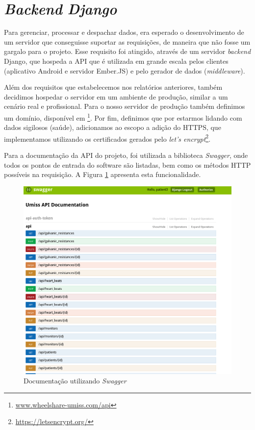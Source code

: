 \section{\textit{Backend} \textit{Django}}

Para gerenciar, processar e despachar dados, era esperado o desenvolvimento de
um servidor que conseguisse suportar as requisições,
de maneira que não fosse um gargalo para o projeto. Esse requisito foi atingido,
através de um servidor \textit{backend} Django, que hospeda a API que é
utilizada em grande escala pelos clientes (aplicativo Android e servidor
       Ember.JS) e pelo gerador de dados (\textit{middleware}).

Além dos requisitos que estabelecemos nos relatórios anteriores, também
decidimos hospedar o servidor em um ambiente de produção, similar a um cenário
real e profissional. Para o nosso servidor de produção também definimos um
domínio, disponível em \footnote{\url{www.wheelshare-umiss.com/api}}. Por fim,
definimos que por estarmos lidando com dados sigilosos (saúde), adicionamos ao
escopo a adição do HTTPS, que implementamos utilizando os certificados gerados
pelo \textit{let's encrypt}\footnote{\url{https://letsencrypt.org/}}.

Para a documentação da API do projeto, foi utilizada a biblioteca \textit{Swagger},
onde todos os pontos de entrada do software são listadas, bem como os
métodos HTTP possíveis na requisição. A Figura \ref{img:swagger} apresenta
esta funcionalidade.

\begin{figure}
    \begin{center}
        \includegraphics[scale=0.4]{figuras/swagger.png}
    \end{center}
    \caption{Documentação utilizando \textit{Swagger}}
    \label{img:swagger}
\end{figure}
